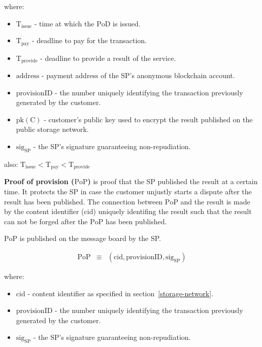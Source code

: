 \documentclass{ieeeaccess}
\begin{document}
where:

\begin{itemize}

\item $\mathrm{T}_\mathrm{issue}$ - time at which the $\mathrm{PoD}$ is issued.
\item
  $\mathrm{T}_\mathrm{pay}$ - deadline to pay for the transaction.
\item
  $\mathrm{T}_\mathrm{provide}$ - deadline to provide a result of the service.
\item $\mathrm{address}$ - payment address of the SP's anonymous blockchain account.
\item $\mathrm{provisionID}$ - the number uniquely identifying the transaction previously generated by the customer.
\item $\mathrm{pk(C)}$ - customer's public key used to encrypt the result published on the public storage network.
\item $\mathrm{sig}_\mathrm{SP}$ - the SP's signature guaranteeing non-repudiation.
\end{itemize}

also:
\(\mathrm{T}_\mathrm{issue} < \mathrm{T}_\mathrm{pay} < \mathrm{T}_\mathrm{provide}\)

\noindent \textbf
{Proof of provision ($\mathrm{PoP}$)}\label{proof-of-provision} is proof that the SP published the result at a certain time. It protects the SP in case the customer unjustly starts a dispute after the result has been published. The connection between $\mathrm{PoP}$ and the result is made by the content identifier ($\mathrm{cid}$) uniquely identifing the result such that the result can not be forged after the $\mathrm{PoP}$ has been published.

$\mathrm{PoP}$ is published on the message board by the SP.


\begin{eqnarray}
\mathrm{PoP} & \equiv & (\mathrm{cid}, \mathrm{provisionID}, \mathrm{sig}_\mathrm{SP})
\end{eqnarray}

where:

\begin{itemize}

\item $\mathrm{cid}$ - content identifier as specified in section~\ref{storage-network}.
\item $\mathrm{provisionID}$ - the number uniquely identifying the transaction previously generated by the customer.
\item $\mathrm{sig}_\mathrm{SP}$ - the SP's signature guaranteeing non-repudiation.
\end{itemize}
\end{document}
